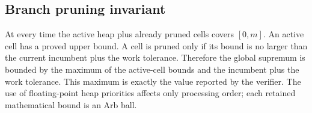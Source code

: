 \subsection{Branch pruning invariant}

At every time the active heap plus already pruned cells covers $[0,m]$.
An active cell has a proved upper bound.  A cell is pruned only if its bound
is no larger than the current incumbent plus the work tolerance.  Therefore
the global supremum is bounded by the maximum of the active-cell bounds and
the incumbent plus the work tolerance.  This maximum is exactly the value
reported by the verifier.  The use of floating-point heap priorities affects
only processing order; each retained mathematical bound is an Arb ball.
